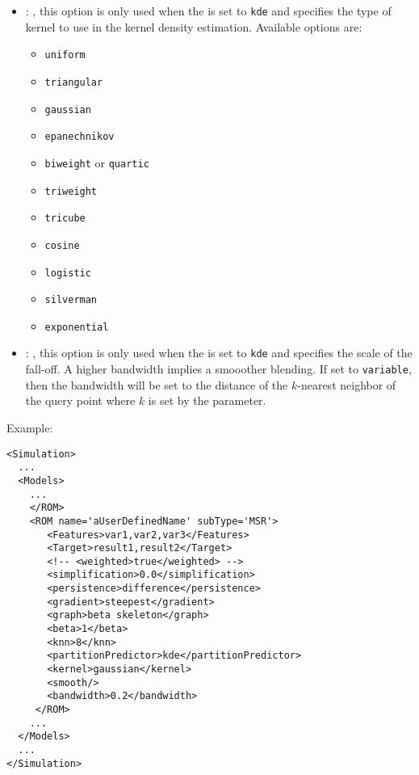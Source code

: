 \begin{itemize}
    \item {}: , 
      this option is only                                                  used when the
       is set to \texttt{kde} and
      specifies the type of kernel to use in the kernel density estimation.
      Available options are:                                                  \begin{itemize}
      \item \texttt{uniform}                                                    \item
      \texttt{triangular}                                                    \item \texttt{gaussian}
      \item \texttt{epanechnikov}                                                    \item
      \texttt{biweight} or \texttt{quartic}                                                    \item
      \texttt{triweight}                                                    \item \texttt{tricube}
      \item \texttt{cosine}                                                    \item
      \texttt{logistic}                                                    \item \texttt{silverman}
      \item \texttt{exponential}                                                  \end{itemize}

    \item {}: , 
      this                                                  option is only used when the
       is set to
      \texttt{kde} and specifies the scale of the fall-off. A higher bandwidth
      implies a smooother blending. If set to \texttt{variable}, then the bandwidth
      will be set to the distance of the $k$-nearest neighbor of the query point
      where $k$ is set by the  parameter.
  \end{itemize}

\hspace{24pt}
Example:
\begin{lstlisting}[style=XML,morekeywords={name,subType}]
<Simulation>
  ...
  <Models>
    ...
    </ROM>
    <ROM name='aUserDefinedName' subType='MSR'>
       <Features>var1,var2,var3</Features>
       <Target>result1,result2</Target>
       <!-- <weighted>true</weighted> -->
       <simplification>0.0</simplification>
       <persistence>difference</persistence>
       <gradient>steepest</gradient>
       <graph>beta skeleton</graph>
       <beta>1</beta>
       <knn>8</knn>
       <partitionPredictor>kde</partitionPredictor>
       <kernel>gaussian</kernel>
       <smooth/>
       <bandwidth>0.2</bandwidth>
     </ROM>
    ...
  </Models>
  ...
</Simulation>
\end{lstlisting}


